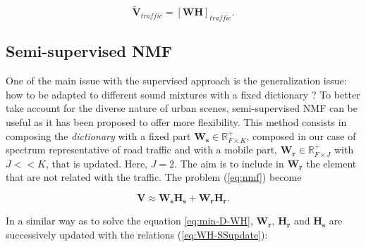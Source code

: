 \documentclass[twocolumn,a4paper,10pt]{article}
\begin{document}
\begin{equation}\label{eq:separationExtraction}
\mathbf{\tilde{V}}_{traffic} = \left[ \mathbf{WH} \right]_{traffic}.
\end{equation}

%
%
%

\subsection{Semi-supervised NMF}

One of the main issue with the supervised approach is the generalization issue: how to be adapted to different sound mixtures with a fixed dictionary ? To better take account for the diverse nature of urban scenes, semi-supervised NMF can be useful as it has been proposed \cite{lee_semi-supervised_2010} to offer more flexibility. This method consists in composing the \textit{dictionary} with a fixed part $\mathbf{W_s} \in \mathbb{R}^+_{F\times K}$, composed in our case of spectrum representative of road traffic and with a mobile part, $\mathbf{W_r} \in \mathbb{R}^+_{F\times J}$ with $J <<K$, that is updated. Here, $J = 2$. The aim is to include in $\mathbf{W_r}$ the element that are not related with the traffic. The problem (\ref{eq:nmf}) become

\begin{equation}
\mathbf{V} \approx \mathbf{W_s H_s}+ \mathbf{W_r H_r}.
\end{equation}

In a similar way as to solve the equation \ref{eq:min-D-WH}, $\mathbf{W_r}$, $\mathbf{H_r}$ and $\mathbf{H_s}$ are successively updated with the relations (\ref{eq:WH-SSupdate}):
\end{document}
